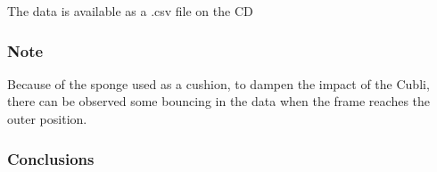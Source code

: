 \begin{minipage}{\linewidth}
\begin{minipage}{0.45\linewidth}
\begin{figure}[H]
			\centering
			\vspace{-.4cm}
			\captionsetup{justification=centering}
			\label{HbridgeCounterClokwise4Q}
		\end{figure}\vspace{-5mm}
	\end{minipage}
\end{minipage} 

The data is available as a .csv file on the CD

%
%
%

\subsubsection{Note}
Because of the sponge used as a cushion, to dampen the impact of the Cubli, there can be observed some bouncing in the data when the frame reaches the outer position.

\subsubsection{Conclusions}

